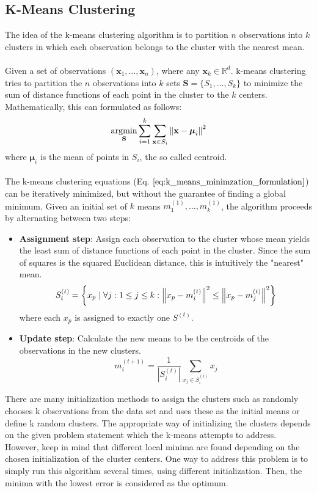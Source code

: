 \subsection{K-Means Clustering}
\label{sec:k_means}
The idea of the k-means clustering algorithm is to partition $n$ observations into $k$ clusters in which each observation belongs to the cluster with the nearest mean. \\ \\
Given a set of observations $(\textbf{x}_1, \dots, \textbf{x}_n)$, where any $\textbf{x}_k \in \mathbb{R}^d$. k-means clustering tries to partition the $n$ observations into $k$ sets $\textbf{S} = \{ S_1, \dots, S_k\}$ to minimize the sum of distance functions of each point in the cluster to the $k$ centers. Mathematically, this can formulated as follows:
\begin{equation}
	\operatorname*{\arg\!\min}_{\textbf{S}} \sum_{i=1}^k \sum_{\textbf{x} \in S_i} \left\lVert\textbf{x} - {\boldsymbol {\mu }}_{i}\right\rVert^2
\label{eq:k_means_minimzation_formulation}
\end{equation}
where ${\boldsymbol {\mu }}_{i}$ is the mean of points in $S_i$, the so called centroid. \\ \\
The k-means clustering equations (Eq. $\ref{eq:k_means_minimzation_formulation}$) can be iteratively minimized, but without the guarantee of finding a global minimum. Given an initial set of $k$ means $m_1^{(1)}, \dots, m_k^{(1)}$, the algorithm proceeds by alternating between two steps:
\begin{itemize}
\item \textbf{Assignment step}: Assign each observation to the cluster whose mean yields the least sum of distance functions of each point in the cluster. Since the sum of squares is the squared Euclidean distance, this is intuitively the "nearest" mean. 
\begin{equation}
  	S_i^{(t)} = \left\{ x_p \mid \forall j: 1 \leq j \leq k: \left\lVert x_p - m_i^{(t)}\right\rVert^2 \leq \left\lVert x_p - m_j^{(t)}\right\rVert^2 \right\}
\end{equation} 
where each $x_p$ is assigned to exactly one $S^{(t)}$.
\item \textbf{Update step}: Calculate the new means to be the centroids of the observations in the new clusters. 
\begin{equation}
	m_i^{(t+1)} = \frac{1}{\left| S_i^{(t)} \right| } \sum_{x_j \in S_i^{(t)}} x_j
\end{equation}
\end{itemize}
There are many initialization methods to assign the clusters such as randomly chooses k observations from the data set and uses these as the initial means or define k random clusters. The appropriate way of initializing the clusters depends on the given problem statement which the k-means attempts to address. However, keep in mind that different local minima are found depending on the chosen initialization of the cluster centers. One way to address this problem is to simply run this algorithm several times, using different initialization. Then, the minima with the lowest error is considered as the optimum.  
